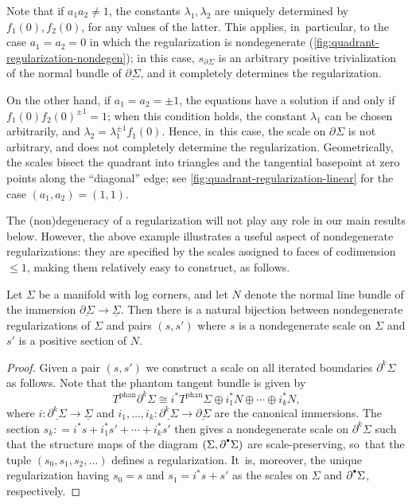 \documentclass[10pt]{amsart}
\let\oldbullet\bullet
\renewcommand{\bullet}{{\raisebox{1pt}{$\scriptscriptstyle\oldbullet$}}}
\theoremstyle{definition}
\theoremstyle{remark}
\newenvironment{example}
  {\pushQED{\qed}\renewcommand{\qedsymbol}{$\lozenge$}\examplex}
  {\popQED\endexamplex}
\renewcommand{\le}{\leqslant}
\newcommand{\defas}{\mathrel{\mathop:}=}
\newcommand{\Sig}{\Sigma}
\newcommand{\uSig}{\underline{\Sigma}}
\newcommand{\phant}{\mathrm{phan}}
\newcommand{\ubdSig}[1][]{\underline{\partial^{#1}\Sigma}}
\newcommand{\bdSig}[1][]{\partial^{#1}\Sigma}
\newcommand{\tbphan}[2][]{T_{#1}^{\phant}#2}
\begin{document}
\begin{example}
Note that if $a_1a_2\neq 1$, the constants $\lambda_1,\lambda_2$ are uniquely determined by $f_1(0),f_2(0)$, for any values of the latter. This applies, in~particular, to the case $a_1=a_2=0$ in which the regularization is nondegenerate (\autoref{fig:quadrant-regularization-nondegen}); in this case, $s_{\bdSig}$ is an arbitrary positive trivialization of the normal bundle of $\ubdSig$, and it completely determines the regularization.

On the other hand, if $a_1=a_2 = \pm 1$, the equations have a solution if and only if $f_1(0)f_2(0)^{\pm 1}=1$; when this condition holds, the constant $\lambda_1$ can be chosen arbitrarily, and $\lambda_2 = \lambda_1^{\pm 1}f_1(0)$. Hence, in~this case, the scale on $\bdSig$ is not arbitrary, and does not completely determine the regularization. Geometrically, the scales bisect the quadrant into triangles and the tangential basepoint at zero points along the ``diagonal'' edge; see \autoref{fig:quadrant-regularization-linear} for the case $(a_1,a_2)=(1,1)$.
\end{example}

The (non)degeneracy of a regularization will not play any role in our main results below. However, the above example illustrates a useful aspect of nondegenerate regularizations: they are specified by the scales assigned to faces of codimension $\le 1$, making them relatively easy to construct, as follows.
\begin{proposition}
Let $\Sig$ be a manifold with log corners, and let $N$ denote the normal line bundle of the immersion $\ubdSig \to \uSig$. Then there is a natural bijection between nondegenerate regularizations of $\Sig$ and pairs $(s,s')$ where $s$ is a nondegenerate scale on $\Sig$ and $s'$ is a positive section of $N$.
\end{proposition}

\begin{proof}
Given a pair $(s,s')$ we construct a scale on all iterated boundaries $\bdSig[k]$ as follows. Note that the phantom tangent bundle is given by
\[
\tbphan{\bdSig[k]} \cong i^* \tbphan{\Sig}\oplus i_1^* N \oplus \cdots \oplus i_k^* N,
\]
where $i \colon \ubdSig[k] \to \uSig$ and $i_1,\ldots,i_k \colon \ubdSig[k] \to \ubdSig$ are the canonical immersions. The section $s_k \defas i^* s + i_1^*s' + \cdots + i_k^* s'$ then gives a nondegenerate scale on $\bdSig[k]$ such that the structure maps of the diagram $(\Sig,\partial^\bullet\Sig)$ are scale-preserving, so~that the tuple
$(s_0,s_1,s_2,\ldots)$ defines a regularization. It~is, moreover, the unique regularization having $s_0 =s$ and $s_1 = i^*s + s'$ as the scales on $\Sig$ and $\partial^\bullet\Sig$, respectively.
\end{proof}
\end{document}
